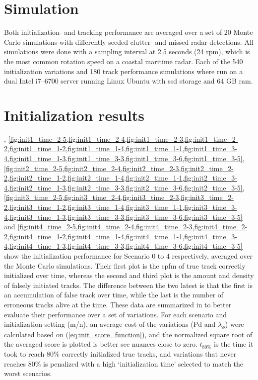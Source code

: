 \section{Simulation}
Both initialization- and tracking performance are averaged over a set of 20 Monte Carlo simulations with differently seeded clutter- and missed radar detections. All simulations were done with a sampling interval at 2.5 seconds (24 \gls{rpm}), which is the most common rotation speed on a coastal maritime radar. Each of the 540 initialization variations and 180 track performance simulations where run on a dual Intel i7--6700 server running Linux Ubuntu with \gls{ssd} storage and 64 GB \gls{ram}.

\section{Initialization results}
, \cref{fig:init1_time_2-5,fig:init1_time_2-4,fig:init1_time_2-3,fig:init1_time_2-2,fig:init1_time_1-2,fig:init1_time_1-4,fig:init1_time_1-1,fig:init1_time_3-4,fig:init1_time_1-3,fig:init1_time_3-3,fig:init1_time_3-6,fig:init1_time_3-5}, \cref{fig:init2_time_2-5,fig:init2_time_2-4,fig:init2_time_2-3,fig:init2_time_2-2,fig:init2_time_1-2,fig:init2_time_1-4,fig:init2_time_1-1,fig:init2_time_3-4,fig:init2_time_1-3,fig:init2_time_3-3,fig:init2_time_3-6,fig:init2_time_3-5}, \cref{fig:init3_time_2-5,fig:init3_time_2-4,fig:init3_time_2-3,fig:init3_time_2-2,fig:init3_time_1-2,fig:init3_time_1-4,fig:init3_time_1-1,fig:init3_time_3-4,fig:init3_time_1-3,fig:init3_time_3-3,fig:init3_time_3-6,fig:init3_time_3-5} and \cref{fig:init4_time_2-5,fig:init4_time_2-4,fig:init4_time_2-3,fig:init4_time_2-2,fig:init4_time_1-2,fig:init4_time_1-4,fig:init4_time_1-1,fig:init4_time_3-4,fig:init4_time_1-3,fig:init4_time_3-3,fig:init4_time_3-6,fig:init4_time_3-5} show the initialization performance for Scenario 0 to 4 respectively, averaged over the Monte Carlo simulations. Their first plot is the \gls{cpfm} of true track correctly initialized over time, whereas the second and third plot is the amount and density of falsely initiated tracks. The difference between the two latest is that the first is an accumulation of false track over time, while the last is the number of erroneous tracks alive at the time. These data are summarized in  to better evaluate their performance over a set of variations. For each scenario and initialization setting (m/n), an average cost of the variations (\gls{Pd} and \(\lambda_\phi\)) were calculated based on (\ref{eq:init_score_function}), and the normalized square root of the averaged score is plotted is better see nuances close to zero. \(t_{80\%}\) is the time it took to reach 80\% correctly initialized true tracks, and variations that never reaches 80\% is penalized with a high `initialization time' selected to match the worst scenarios.


